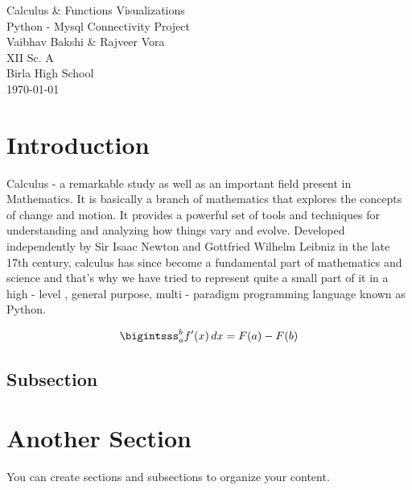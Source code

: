 \documentclass[12pt]{article}
\begin{document}
\begin{titlepage}
  \begin{center}
    \vspace*{\fill}
    \Huge {Calculus \& Functions Visualizations} \\
    \Huge {Python - Mysql Connectivity Project} \\[3cm]  %
    \Large Vaibhav Bakshi \& Rajveer Vora \\
    \Large XII Sc. A \\
    \Large Birla High School \\
    \vspace*{\fill}
    \today
  \end{center}
\end{titlepage}

\newpage
\section{Introduction}

Calculus - a remarkable study as well as an important field present in Mathematics. It is basically a branch of mathematics that explores the concepts of change and motion. It provides a powerful set of tools and techniques for understanding and analyzing how things vary and evolve. Developed independently by Sir Isaac Newton and Gottfried Wilhelm Leibniz in the late 17th century, calculus has since become a fundamental part of mathematics and science and that's why we have tried to represent quite a small part of it in a high - level , general purpose, multi - paradigm programming language known as Python.

\begin{equation*}
\bigintsss_{a}^{b} f'(x) \, dx = F(a) - F(b)
\end{equation*}

\subsection{Subsection}

\section{Another Section}

You can create sections and subsections to organize your content.



\end{document}
